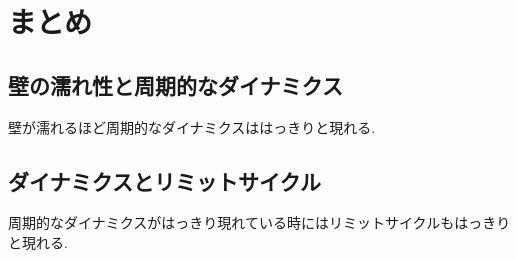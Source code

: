 \chapter{まとめ}

\section{壁の濡れ性と周期的なダイナミクス}

壁が濡れるほど周期的なダイナミクスははっきりと現れる.

\section{ダイナミクスとリミットサイクル}

周期的なダイナミクスがはっきり現れている時にはリミットサイクルもはっきりと現れる.